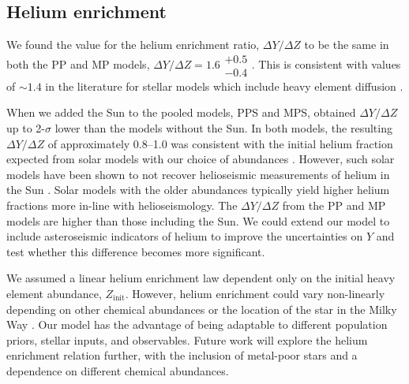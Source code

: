 \documentclass[a4paper,fleqn,usenatbib]{mnras}
\begin{document}
\subsection{Helium enrichment}\label{sec:helium}

We found the value for the helium enrichment ratio, $\Delta Y / \Delta Z$ to be the same in both the PP and MP models, $\Delta Y / \Delta Z = 1.6\substack{+0.5\\-0.4}$. This is consistent with values of $\sim 1.4$ in the literature for stellar models which include heavy element diffusion \citep{Brogaard.VandenBerg.ea2012, Verma.Raodeo.ea2019}.

When we added the Sun to the pooled models, PPS and MPS, obtained $\Delta Y / \Delta Z$ up to 2-$\sigma$ lower than the models without the Sun. In both models, the resulting $\Delta Y / \Delta Z$ of approximately \numrange{0.8}{1.0} was consistent with the initial helium fraction expected from solar models with our choice of \citet{Asplund.Grevesse.ea2009} abundances \citep{Serenelli.Basu2010}. However, such solar models have been shown to not recover helioseismic measurements of helium in the Sun \citep{Basu.Antia2004, Serenelli.Basu.ea2009, Villante.Serenelli.ea2014}. Solar models with the older \citet{Grevesse.Sauval1998} abundances typically yield higher helium fractions more in-line with helioseismology. The $\Delta Y / \Delta Z$ from the PP and MP models are higher than those including the Sun. We could extend our model to include asteroseismic indicators of helium to improve the uncertainties on $Y$ and test whether this difference becomes more significant.


We assumed a linear helium enrichment law dependent only on the initial heavy element abundance, $Z_\mathrm{init}$. However, helium enrichment could vary non-linearly depending on other chemical abundances \citep{West.Heger2013} or the location of the star in the Milky Way \citep{Frebel2010}. Our model has the advantage of being adaptable to different population priors, stellar inputs, and observables. Future work will explore the helium enrichment relation further, with the inclusion of metal-poor stars and a dependence on different chemical abundances.
\end{document}
